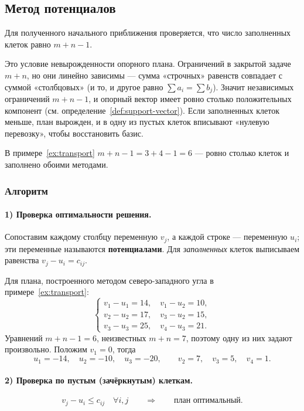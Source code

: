 \subsection{Метод потенциалов}

Для полученного начального приближения проверяется, что число заполненных клеток
равно $m + n - 1$.

\begin{idea}
Это условие невырожденности опорного плана. Ограничений в закрытой задаче
$m + n$, но они линейно зависимы — сумма «строчных» равенств совпадает с суммой
«столбцовых» (и то, и другое равно $\sum a_i = \sum b_j$). Значит независимых
ограничений $m + n - 1$, и опорный вектор имеет ровно столько положительных
компонент (см. определение~\ref{def:support-vector}). Если заполненных клеток
меньше, план вырожден, и в одну из пустых клеток вписывают «нулевую перевозку»,
чтобы восстановить базис.

В примере~\ref{ex:transport} $m + n - 1 = 3 + 4 - 1 = 6$ — ровно столько клеток
и заполнено обоими методами.
\end{idea}

\subsubsection*{Алгоритм}

\paragraph{1) Проверка оптимальности решения.}
Сопоставим каждому столбцу переменную $v_j$, а каждой строке — переменную $u_i$;
эти переменные называются \textbf{потенциалами}. Для \emph{заполненных} клеток
выписываем равенства $v_j - u_i = c_{ij}$.

Для плана, построенного методом северо-западного угла в примере~\ref{ex:transport}:
\[
  \begin{cases}
    v_1 - u_1 = 14, \quad v_1 - u_2 = 10, \\
    v_2 - u_2 = 17, \quad v_3 - u_2 = 15, \\
    v_3 - u_3 = 25, \quad v_4 - u_3 = 21 .
  \end{cases}
\]
Уравнений $m + n - 1 = 6$, неизвестных $m + n = 7$, поэтому одну из них задают
произвольно. Положим $v_1 = 0$, тогда
\[
  u_1 = -14, \quad u_2 = -10, \quad u_3 = -20,
  \qquad v_2 = 7, \quad v_3 = 5, \quad v_4 = 1 .
\]

\paragraph{2) Проверка по пустым (зачёркнутым) клеткам.}
\[
  v_j - u_i \le c_{ij} \quad \forall i, j
  \qquad\Longrightarrow\qquad \text{план оптимальный} .
\]

